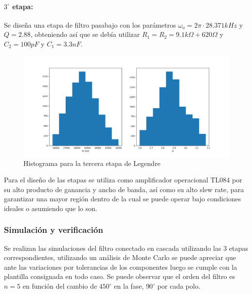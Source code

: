 \paragraph{$3^{\circ}$ etapa:} Se dise\~na una etapa de filtro pasabajo con los par\'ametros $\omega_o = 2 \pi \cdot 28.371kHz$ y $Q = 2.88$, obteniendo as\'i que se deb\'ia utilizar $R_1 = R_2 = 9.1k\Omega + 620 \Omega$ y $C_2 = 100pF$ y $C_1 = 3.3nF$.

\begin{figure}[H]
    \centering
    \includegraphics[scale=0.4]{../EJ1/Recursos/legendre_histogram_three.png}
    \caption{Histograma para la tercera etapa de Legendre}
    \label{fig:legendre_histogram_three}
\end{figure}

Para el dise\~no de las etapas se utiliza como amplificador operacional TL084 por su alto producto de ganancia y ancho de banda, as\'i como su alto slew rate, para garantizar una mayor regi\'on dentro de la cual se puede operar bajo condiciones ideales o asumiendo que lo son.

\subsubsection{Simulaci\'on y verificaci\'on}
Se realizan las simulaciones del filtro conectado en cascada utilizando las 3 etapas correspondientes, utilizando un an\'alisis de Monte Carlo se puede apreciar que ante las variaciones por tolerancias
de los componentes luego se cumple con la plantilla consignada en todo caso. Se puede observar que el orden del filtro es $n = 5$ en funci\'on del cambio de $450^{\circ}$ en la fase, $90^{\circ}$ por cada polo.

